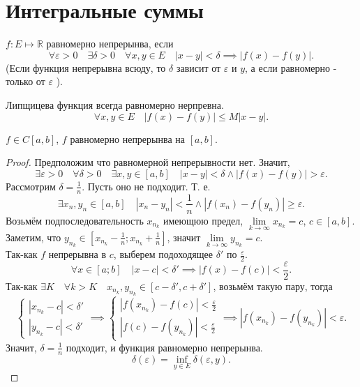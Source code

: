 \documentclass[11pt, oneside]{article}   	%
\begin{document}
\section{Интегральные суммы}
    \begin{definition}
        $f: E \mapsto \mathbb{R}$ равномерно непрерынва, если
        \[ \forall{\varepsilon > 0}\quad \exists{\delta > 0}\quad \forall{x, y\in E}\quad |x-y| < \delta \implies|f(x)-f(y)| .\]
        (Если функция непрерывна всюду, то $\delta$ зависит от $\varepsilon$ и $y$, а если равномерно - только от $\varepsilon$ ).
    \end{definition}
    \begin{dlemma}
        Липщицева функция всегда равномерно нерпревна.
        \[ \forall{x, y\in E} \quad |f(x) - f(y)| \le M |x-y|.\] 
    \end{dlemma}
    \begin{theorem}
        $f\in C[a, b]$, $f$ равномерно непрерынва на $\left[a, b\right]$.
        \begin{proof}
            Предположим что равномерной непрерывности нет.
            Значит,
            \[ \exists{\varepsilon > 0}\quad \forall{\delta > 0}\quad \exists{x, y\in \left[a, b\right]}\quad |x-y| < \delta \land |f(x)-f(y)| > \varepsilon  .\]
            Рассмотрим $\delta=\frac{1}{n}$. Пусть оно не подходит. Т. е.
            \[ \exists{x_n, y_n\in \left[a, b\right]}\quad |x_n - y_n| < \frac{1}{n} \land |f(x_n) - f(y_n)| \ge \varepsilon  .\]
            Возьмём подпоследовательность $x_{n_k}$ имеющюю предел, $\lim\limits_{k \to \infty} x_{n_{k}} = c$, $c\in \left[a, b\right]$.\\
            Заметим, что $y_{n_k}\in \left[x_{n_k} - \frac{1}{n}; x_{n_k} + \frac{1}{n}\right]$, значит $\lim\limits_{k \to \infty} y_{n_k} = c$.\\
            Так-как $f$ непрерывна в $c$, выберем подоходящее $\delta'$ по $\frac{\varepsilon}{2}$.\\
            \[ \forall{x\in \left[a; b\right]}\quad |x-c| < \delta' \implies |f(x)-f(c)| < \frac{\varepsilon}{2} .\]
            Так-как $\exists{K}\quad \forall{k > K}\quad x_{n_k}, y_{n_k}\in \left[c - \delta', c + \delta'\right]$, возьмём такую пару, тогда
            \[ \begin{cases}
                |x_{n_k} - c| < \delta'\\
                |y_{n_k} - c| < \delta'
            \end{cases} \implies \begin{cases}
            |f(x_{n_k})-f(c)| < \frac{\varepsilon}{2}\\
            |f(c) - f(y_{n_k})| < \frac{\varepsilon}{2}
        \end{cases} \implies |f(x_{n_k}) - f(y_{n_k})| < \varepsilon .\]
        Значит, $\delta = \frac{1}{n}$ подходит, и функция равномерно непрерынва.
            \[ \delta(\varepsilon) = \inf\limits_{y\in E} \delta(\varepsilon, y) .\] 
        \end{proof}
    \end{theorem}
\end{document}
